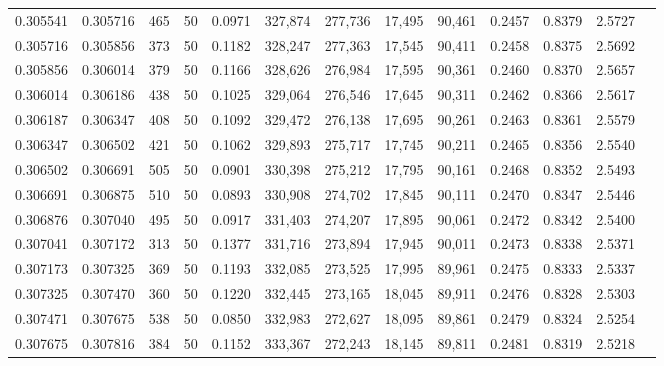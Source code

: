 \begin{tabular}{rrrrrrrrrrrrr}
0.305541 & 0.305716 &   465 &  50 &                                     0.0971 & 327,874 & 277,736 &  17,495 &  90,461 & 0.2457 & 0.8379 & 2.5727 \\
0.305716 & 0.305856 &   373 &  50 &                                     0.1182 & 328,247 & 277,363 &  17,545 &  90,411 & 0.2458 & 0.8375 & 2.5692 \\
0.305856 & 0.306014 &   379 &  50 &                                     0.1166 & 328,626 & 276,984 &  17,595 &  90,361 & 0.2460 & 0.8370 & 2.5657 \\
0.306014 & 0.306186 &   438 &  50 &                                     0.1025 & 329,064 & 276,546 &  17,645 &  90,311 & 0.2462 & 0.8366 & 2.5617 \\
0.306187 & 0.306347 &   408 &  50 &                                     0.1092 & 329,472 & 276,138 &  17,695 &  90,261 & 0.2463 & 0.8361 & 2.5579 \\
0.306347 & 0.306502 &   421 &  50 &                                     0.1062 & 329,893 & 275,717 &  17,745 &  90,211 & 0.2465 & 0.8356 & 2.5540 \\
0.306502 & 0.306691 &   505 &  50 &                                     0.0901 & 330,398 & 275,212 &  17,795 &  90,161 & 0.2468 & 0.8352 & 2.5493 \\
0.306691 & 0.306875 &   510 &  50 &                                     0.0893 & 330,908 & 274,702 &  17,845 &  90,111 & 0.2470 & 0.8347 & 2.5446 \\
0.306876 & 0.307040 &   495 &  50 &                                     0.0917 & 331,403 & 274,207 &  17,895 &  90,061 & 0.2472 & 0.8342 & 2.5400 \\
0.307041 & 0.307172 &   313 &  50 &                                     0.1377 & 331,716 & 273,894 &  17,945 &  90,011 & 0.2473 & 0.8338 & 2.5371 \\
0.307173 & 0.307325 &   369 &  50 &                                     0.1193 & 332,085 & 273,525 &  17,995 &  89,961 & 0.2475 & 0.8333 & 2.5337 \\
0.307325 & 0.307470 &   360 &  50 &                                     0.1220 & 332,445 & 273,165 &  18,045 &  89,911 & 0.2476 & 0.8328 & 2.5303 \\
0.307471 & 0.307675 &   538 &  50 &                                     0.0850 & 332,983 & 272,627 &  18,095 &  89,861 & 0.2479 & 0.8324 & 2.5254 \\
0.307675 & 0.307816 &   384 &  50 &                                     0.1152 & 333,367 & 272,243 &  18,145 &  89,811 & 0.2481 & 0.8319 & 2.5218 \\

\end{tabular}
